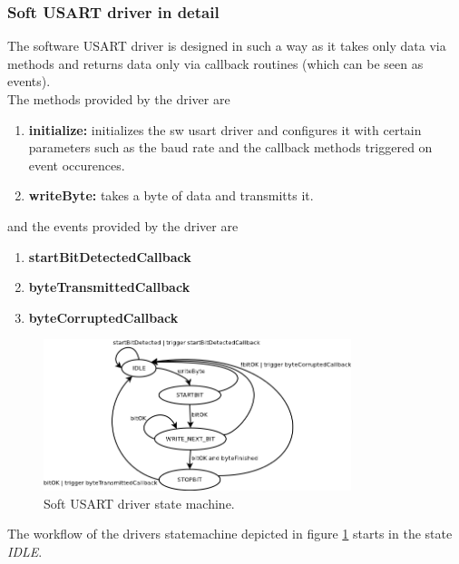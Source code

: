 \subsubsection{Soft USART driver in detail}
\label{sec:bus:design:layer1:interface:swuart}

The software USART driver is designed in such a way as it takes only data via methods and returns data only via callback routines (which can be seen as events).\\

The methods provided by the driver are

\begin{enumerate}
 \item \textbf{initialize: } initializes the sw usart driver and configures it with certain parameters such as the baud rate and the callback methods triggered on event occurences.
 \item \textbf{writeByte: } takes a byte of data and transmitts it.
\end{enumerate}

and the events provided by the driver are

\begin{enumerate}
 \item \textbf{startBitDetectedCallback}
 \item \textbf{byteTransmittedCallback}
 \item \textbf{byteCorruptedCallback}
\end{enumerate}

\begin{figure}[h]
\centering
\includegraphics[width=0.8\textwidth]{../images/swuart_statemachine.png}
\caption{Soft USART driver state machine.}
\label{fig:bus:design:layer1:interface:swuart}
\end{figure}

The workflow of the drivers statemachine depicted in figure \ref{fig:bus:design:layer1:interface:swuart} starts in the state \textit{IDLE}.\\

